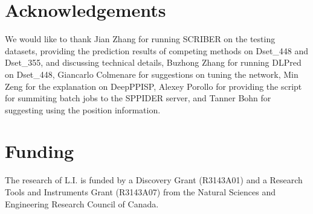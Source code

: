 \documentclass{bioinfo}
\begin{document}
\section*{Acknowledgements}
We would like to thank Jian Zhang for running SCRIBER on the testing datasets, providing the prediction results of competing methods on Dset\_448 and Dset\_355, and discussing technical details, Buzhong Zhang for running DLPred on Dset\_448, Giancarlo Colmenare for suggestions on tuning the network, Min Zeng for the explanation on DeepPPISP, Alexey Porollo for providing the script for summiting batch jobs to the SPPIDER server, and Tanner Bohn for suggesting using the position information.

\section*{Funding}
The research of L.I. is funded by a Discovery Grant (R3143A01) and a Research Tools and Instruments Grant (R3143A07) from the Natural Sciences and Engineering Research Council of Canada.



%

\end{document}
